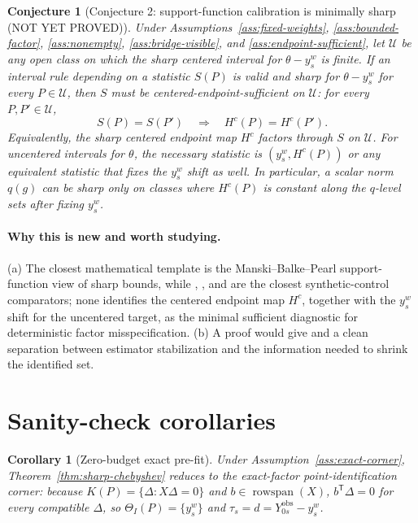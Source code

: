 \documentclass[11pt]{article}
\newcommand{\transpose}{\mathsf{T}}
\theoremstyle{definition}
\theoremstyle{plain}
\newtheorem{conjecture}{Conjecture}
\newtheorem{corollary}{Corollary}
\theoremstyle{remark}
\begin{document}
\begin{conjecture}[Conjecture 2: support-function calibration is minimally sharp (NOT YET PROVED)]\label{conj:minimal-support}
Under Assumptions~\ref{ass:fixed-weights}, \ref{ass:bounded-factor}, \ref{ass:nonempty}, \ref{ass:bridge-visible}, and \ref{ass:endpoint-sufficient}, let \(\mathcal U\) be any open class on which the sharp centered interval for \(\theta-y_s^w\) is finite. If an interval rule depending on a statistic \(S(P)\) is valid and sharp for \(\theta-y_s^w\) for every \(P\in\mathcal U\), then \(S\) must be centered-endpoint-sufficient on \(\mathcal U\): for every \(P,P'\in\mathcal U\),
\[
S(P)=S(P')\quad\Longrightarrow\quad H^c(P)=H^c(P').
\]
Equivalently, the sharp centered endpoint map \(H^c\) factors through \(S\) on \(\mathcal U\). For uncentered intervals for \(\theta\), the necessary statistic is \((y_s^w,H^c(P))\) or any equivalent statistic that fixes the \(y_s^w\) shift as well. In particular, a scalar norm \(q(g)\) can be sharp only on classes where \(H^c(P)\) is constant along the \(q\)-level sets after fixing \(y_s^w\).
\end{conjecture}
\paragraph{Why this is new and worth studying.}
(a) The closest mathematical template is the Manski--Balke--Pearl support-function view of sharp bounds, while \citet{CattaneoFengTitiunik2021}, \citet{NazaretShiBlei2024}, and \citet{ZeitlerVlontzosGilliganLee2023} are the closest synthetic-control comparators; none identifies the centered endpoint map \(H^c\), together with the \(y_s^w\) shift for the uncentered target, as the minimal sufficient diagnostic for deterministic factor misspecification. (b) A proof would give \citet{BenMichaelFellerRothstein2021} and \citet{ArkhangelskyAtheyHirshbergImbensWager2021} a clean separation between estimator stabilization and the information needed to shrink the identified set.

\section{Sanity-check corollaries}
\begin{corollary}[Zero-budget exact pre-fit]\label{cor:zero-budget}
Under Assumption~\ref{ass:exact-corner}, Theorem~\ref{thm:sharp-chebyshev} reduces to the \citet{AbadieDiamondHainmueller2010} exact-factor point-identification corner: because \(K(P)=\{\Delta:X\Delta=0\}\) and \(b\in\operatorname{rowspan}(X)\), \(b^\transpose\Delta=0\) for every compatible \(\Delta\), so \(\Theta_I(P)=\{y_s^w\}\) and \(\tau_s=d=Y_{0s}^{\mathrm{obs}}-y_s^w\).
\end{corollary}
\end{document}

